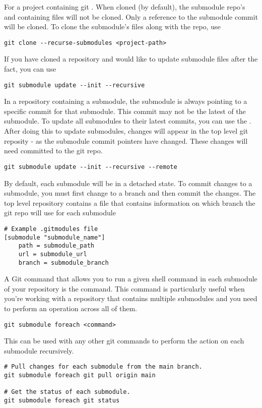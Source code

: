 \myindent For a project containing git . When cloned (by default), the submodule repo's and containing files will not be cloned. Only a reference to the submodule commit will be cloned. To clone the submodule's files along with the repo, use
\begin{lstlisting}[style=terminalstyle]
git clone --recurse-submodules <project-path>
\end{lstlisting}

If you have cloned a repository and would like to update submodule files after the fact, you can use
\begin{lstlisting}[style=terminalstyle]
git submodule update --init --recursive
\end{lstlisting}

In a repository containing a submodule, the submodule is always pointing to a specific commit for that submodule. This commit may not be the latest of the submodule. To update all submodules to their latest commits, you can use the . After doing this to update submodules, changes will appear in the top level git reposity - as the submodule commit pointers have changed. These changes will need committed to the git repo.
\begin{lstlisting}[style=terminalstyle]
git submodule update --init --recursive --remote
\end{lstlisting}

By default, each submodule will be in a detached  state. To commit changes to a submodule, you must first change to a branch and then commit the changes. The top level repository contains a  file that contains information on which branch the git repo will use for each submodule
\begin{lstlisting}
# Example .gitmodules file
[submodule "submodule_name"]
    path = submodule_path
    url = submodule_url
    branch = submodule_branch
\end{lstlisting}

A Git command that allows you to run a given shell command in each submodule of your repository is the  command. This command is particularly useful when you're working with a repository that contains multiple submodules and you need to perform an operation across all of them.
\begin{lstlisting}[style=terminalstyle]
git submodule foreach <command>
\end{lstlisting}

This can be used with any other git commands to perform the action on each submodule recursively.
\begin{lstlisting}[style=terminalstyle]
# Pull changes for each submodule from the main branch.
git submodule foreach git pull origin main

# Get the status of each submodule.
git submodule foreach git status
\end{lstlisting}






